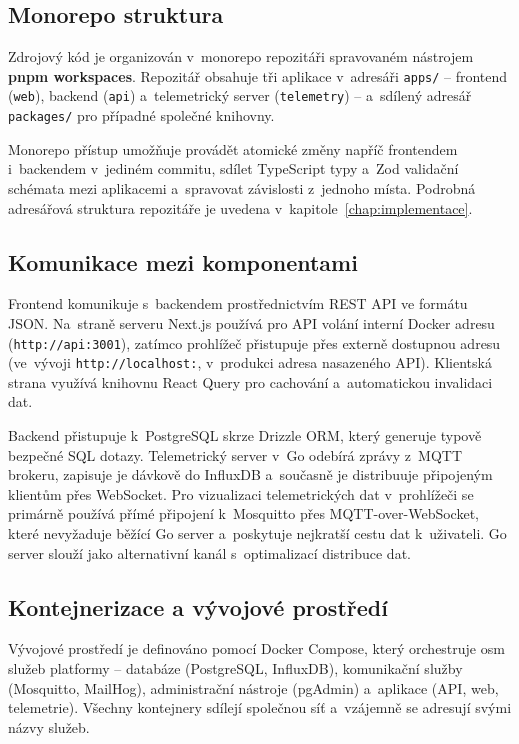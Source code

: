 \subsection{Monorepo struktura}

Zdrojový kód je organizován v~monorepo repozitáři spravovaném nástrojem \textbf{pnpm workspaces}. Repozitář obsahuje tři aplikace v~adresáři \texttt{apps/} -- frontend (\texttt{web}), backend (\texttt{api}) a~telemetrický server (\texttt{telemetry}) -- a~sdílený adresář \texttt{packages/} pro případné společné knihovny.

Monorepo přístup umožňuje provádět atomické změny napříč frontendem i~backendem v~jediném commitu, sdílet TypeScript typy a~Zod validační schémata mezi aplikacemi a~spravovat závislosti z~jednoho místa. Podrobná adresářová struktura repozitáře je uvedena v~kapitole~\ref{chap:implementace}.

\subsection{Komunikace mezi komponentami}

\begin{sloppypar}Frontend komunikuje s~backendem prostřednictvím REST API ve formátu JSON. Na~straně serveru Next.js používá pro API volání interní Docker adresu (\texttt{http://\allowbreak api:3001}), zatímco prohlížeč přistupuje přes externě dostupnou adresu (ve~vývoji \texttt{http://\allowbreak localhost:}, v~produkci adresa nasazeného API). Klientská strana využívá knihovnu React Query pro cachování a~automatickou invalidaci dat.\end{sloppypar}

Backend přistupuje k~PostgreSQL skrze Drizzle ORM, který generuje typově bezpečné SQL dotazy. Telemetrický server v~Go odebírá zprávy z~MQTT brokeru, zapisuje je dávkově do InfluxDB a~současně je distribuuje připojeným klientům přes WebSocket. Pro vizualizaci telemetrických dat v~prohlížeči se primárně používá přímé připojení k~Mosquitto přes MQTT-over-WebSocket, které nevyžaduje běžící Go server a~poskytuje nejkratší cestu dat k~uživateli. Go server slouží jako alternativní kanál s~optimalizací distribuce dat.

\subsection{Kontejnerizace a vývojové prostředí}

\begin{sloppypar}
Vývojové prostředí je definováno pomocí Docker Compose, který orchestruje osm služeb platformy -- databáze (PostgreSQL, InfluxDB), komunikační služby (Mosquitto, MailHog), administrační nástroje (pgAdmin) a~aplikace (API, web, telemetrie). Všechny kontejnery sdílejí společnou síť a~vzájemně se adresují svými názvy služeb.
\end{sloppypar}

